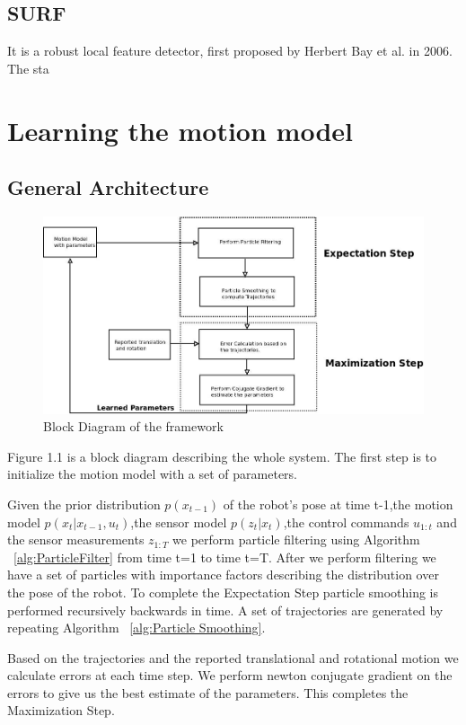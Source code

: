 \documentclass[12pt]{dalcsthesis}
\begin{document}
 

\section{SURF}
It is a robust local feature detector, first proposed by Herbert Bay et al. in 2006. The sta

\chapter{Learning the motion model}
\section{General Architecture}


\begin{figure}[hbtp]
\caption{Block Diagram of the framework}
\centering
\includegraphics[scale=0.5]{Diagram1.jpeg}
\end{figure}



Figure 1.1 is a block diagram describing the whole system. The
first step is to initialize the motion model with a set of parameters.

Given the prior distribution $p(x_{t-1})$ of the robot's pose at time t-1,the motion model $p(x_{t}|x_{t-1},u_{t})$,the sensor model $p(z_{t}|x_{t})$,the control commands $u_{1:t}$ and the sensor measurements $z_{1:T}$ we perform particle filtering using Algorithm  ~\ref{alg:ParticleFilter} from time t=1 to time t=T. After we perform filtering we have a set of particles with importance factors describing the distribution over the pose of the robot.
To complete the Expectation Step particle smoothing is performed recursively backwards in time. A set of trajectories are generated by repeating Algorithm ~\ref{alg:Particle Smoothing}.


Based on the trajectories and the reported translational and rotational 
motion we calculate errors at each time step. We perform newton conjugate
gradient on the errors to give us the best estimate of the parameters.
This completes the Maximization Step.
\end{document}
